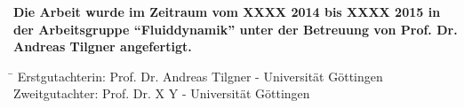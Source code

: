 \documentclass[12pt,a4paper,headsepline,bibliography=totoc,idxtotoc,DIV12,openright,twoside=true,chapterprefix=on]{scrbook} %
\theoremstyle{definition}
\theoremstyle{plain}
\begin{document}
\mbox{}
\thispagestyle{empty}
\newpage
\newpage
{}
\thispagestyle{empty}
\vfill
\noindent \textbf{Die Arbeit wurde im Zeitraum vom XXXX 2014 bis XXXX 2015 in der Arbeitsgruppe "`Fluiddynamik"'
 unter der Betreuung von Prof. Dr. Andreas Tilgner angefertigt. }\\
%
\vfill
\begin{tabbing}
  \hspace{3cm}\=\kill
   Erstgutachterin: \quad  Prof. Dr. Andreas Tilgner - Universität Göttingen\\
   Zweitgutachter: \quad  Prof. Dr. X Y - Universität Göttingen\\
\end{tabbing}

\newpage
\mbox{}
\thispagestyle{empty}
\newpage


\end{document}
